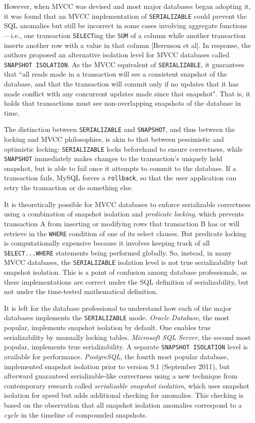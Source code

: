 \documentclass[12pt]{article} %
\begin{document}
However, when MVCC was devised and most major databases began adopting it, it was found that an MVCC implementation of \texttt{SERIALIZABLE} could prevent the SQL anomalies but still be incorrect in some cases involving aggregate functions---i.e., one transaction \texttt{SELECT}ing the \texttt{SUM} of a column while another transaction inserts another row with a value in that column [Berenson et al]. In response, the authors proposed an alternative isolation level for MVCC databases called \texttt{SNAPSHOT ISOLATION}. As the MVCC equivalent of \texttt{SERIALIZABLE}, it guarantees that ``all reads made in a transaction will see a consistent snapshot of the database, and that the transaction will commit only if no updates that it has made conflict with any concurrent updates made since that snapshot". That is, it holds that transactions must see non-overlapping snapshots of the database in time.

The distinction between \texttt{SERIALIZABLE} and \texttt{SNAPSHOT}, and thus between the locking and MVCC philosophies, is akin to that between pessimistic and optimistic locking: \texttt{SERIALIZABLE} locks beforehand to ensure correctness, while \texttt{SNAPSHOT} immediately makes changes to the transaction's uniquely held snapshot, but is able to fail once it attempts to commit to the database. If a transaction fails, MySQL forces a \texttt{rollback}, so that the user application can retry the transaction or do something else.

It is theoretically possible for MVCC databases to enforce serializable correctness using a combination of snapshot isolation and \textsl{predicate locking}, which prevents transaction A from inserting or modifying rows that transaction B has or will retrieve in the \texttt{WHERE} condition of one of its select clauses. But predicate locking is computationally expensive because it involves keeping track of all \texttt{SELECT...WHERE} statements being performed globally. So, instead, in many MVCC databases, the \texttt{SERIALIZABLE} isolation level is not true serializability but snapshot isolation. This is a point of confusion among database professionals, as these implementations are correct under the SQL definition of serializability, but not under the time-tested mathematical definition.

It is left for the database professional to understand how each of the major databases implements the \texttt{SERIALIZABLE} mode. \textsl{Oracle Database}, the most popular, implements snapshot isolation by default. One enables true serializability by manually locking tables.
\textsl{Microsoft SQL Server}, the second most popular, implements true serializability. A separate \texttt{SNAPSHOT ISOLATION} level is available for performance.
\textsl{PostgreSQL}, the fourth most popular database, implemented snapshot isolation prior to version 9.1 (September 2011), but afterward guaranteed serializable-like correctness using a new technique from contemporary research called \textsl{serializable snapshot isolation}, which uses snapshot isolation for speed but adds additional checking for anomalies. This checking is based on the observation that all snapshot isolation anomalies correspond to a \textsl{cycle} in the timeline of compounded snapshots.
\end{document}

